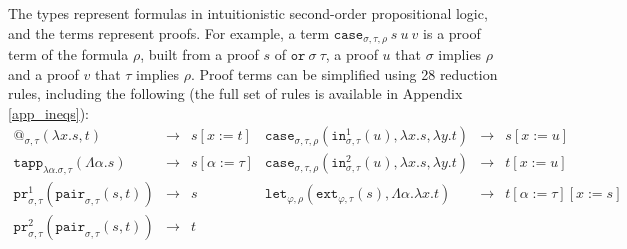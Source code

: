 \documentclass[a4paper,UKenglish,cleveref,autoref,numberwithinsect]{lipics-v2019}
\theoremstyle{definition}
\newcommand{\abs}[2]{\lambda #1.#2}
\newcommand{\tabs}[2]{\Lambda #1.#2}
\newcommand{\red}{\longrightarrow}
\newcommand{\proj}{\mathtt{pr}}
\begin{document}
The types represent formulas in intuitionistic second-order
propositional logic, and the terms represent proofs.  For example, a
term $\mathtt{case}_{\sigma,\tau,\rho}\ s\ u\ v$ is a proof term of
the formula $\rho$, built from a proof $s$ of
$\mathtt{or}\ \sigma\ \tau$, a proof $u$ that $\sigma$ implies $\rho$
and a proof $v$ that $\tau$ implies $\rho$.  Proof terms can be
simplified using 28 reduction rules, including the following (the full
set of rules is available in Appendix \ref{app_ineqs}):
\[
\begin{array}{rclrcl}
@_{\sigma,\tau}(\abs{x}{s},t) & \red & s[x:=t] &
\mathtt{case}_{\sigma,\tau,\rho}(\mathtt{in}^1_{\sigma,\tau}(u),
  \abs{x}{s},\abs{y}{t}) & \red & s[x:=u] \\

\mathtt{tapp}_{\abs{\alpha}{\sigma},\tau}(\tabs{\alpha}{s}) & \red &
  s[\alpha:=\tau] &
\mathtt{case}_{\sigma,\tau,\rho}(\mathtt{in}^2_{\sigma,\tau}(u),
  \abs{x}{s},\abs{y}{t}) & \red & t[x:=u] \\

\proj^1_{\sigma,\tau}(\mathtt{pair}_{\sigma,\tau}(s,t)) & \red & s &
\mathtt{let}_{\varphi,\rho}(\mathtt{ext}_{\varphi,\tau}(s),\tabs{\alpha}{\abs{x}{t}}) & \red & t[\alpha:=\tau][x:=s] \\

\proj^2_{\sigma,\tau}(\mathtt{pair}_{\sigma,\tau}(s,t)) & \red & t \\
\end{array}
\]
\end{document}

